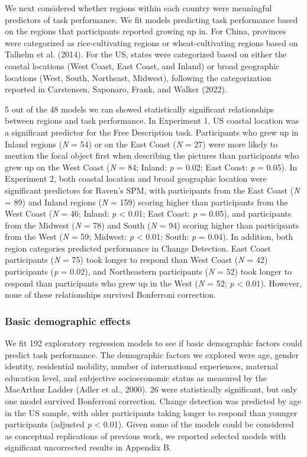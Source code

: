 \documentclass[
  man,floatsintext]{apa6}
\begin{document}
We next considered whether regions within each country were meaningful predictors of task performance. We fit models predicting task performance based on the regions that participants reported growing up in. For China, provinces were categorized as rice-cultivating regions or wheat-cultivating regions based on Talhelm et al. (2014). For the US, states were categorized based on either the coastal locations (West Coast, East Coast, and Inland) or broad geographic locations (West, South, Northeast, Midwest), following the categorization reported in Carstensen, Saponaro, Frank, and Walker (2022).

5 out of the 48 models we ran showed statistically significant relationships between regions and task performance. In Experiment 1, US coastal location was a significant predictor for the Free Description task. Participants who grew up in Inland regions (\emph{N} = 54) or on the East Coast (\emph{N} = 27) were more likely to mention the focal object first when describing the pictures than participants who grew up on the West Coast (\emph{N} = 84; Inland: \emph{p} = 0.02; East Coast: \emph{p} = 0.05). In Experiment 2, both coastal location and broad geographic location were significant predictors for Raven's SPM, with participants from the East Coast (\emph{N} = 89) and Inland regions (\emph{N} = 159) scoring higher than participants from the West Coast (\emph{N} = 46; Inland: \emph{p} \textless{} 0.01; East Coast: \emph{p} = 0.05), and participants from the Midwest (\emph{N} = 78) and South (\emph{N} = 94) scoring higher than participants from the West (\emph{N} = 59; Midwest: \emph{p} \textless{} 0.01; South: \emph{p} = 0.04). In addition, both region categories predicted performance in Change Detection. East Coast participants (\emph{N} = 75) took longer to respond than West Coast (\emph{N} = 42) participants (\emph{p} = 0.02), and Northeastern participants (\emph{N} = 52) took longer to respond than participants who grew up in the West (\emph{N} = 52; \emph{p} \textless{} 0.01). However, none of these relationships survived Bonferroni correction.

\hypertarget{basic-demographic-effects}{%
\subsubsection{Basic demographic effects}\label{basic-demographic-effects}}

We fit 192 exploratory regression models to see if basic demographic factors could predict task performance. The demographic factors we explored were age, gender identity, residential mobility, number of international experiences, maternal education level, and subjective socioeconomic status as measured by the MacArthur Ladder (Adler et al., 2000). 26 were statistically significant, but only one model survived Bonferroni correction. Change detection was predicted by age in the US sample, with older participants taking longer to respond than younger participants (adjusted \emph{p} \textless{} 0.01). Given some of the models could be considered as conceptual replications of previous work, we reported selected models with significant uncorrected results in Appendix B.
\end{document}
